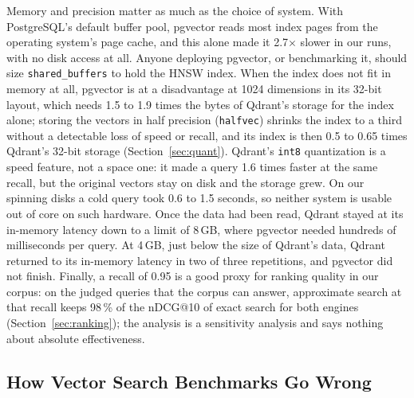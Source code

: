 \documentclass[preprint,12pt]{elsarticle}
\begin{document}
Memory and precision matter as much as the choice of system. With PostgreSQL's
default buffer pool, pgvector reads most index pages from the operating system's page
cache, and this alone made it 2.7$\times$ slower in our runs, with no disk access at all.
Anyone deploying pgvector, or benchmarking it, should size \texttt{shared\_buffers} to
hold the HNSW index. When the index does not fit in memory at all, pgvector is at a
disadvantage at 1024 dimensions in its 32-bit layout, which needs 1.5 to 1.9 times the bytes of Qdrant's storage for the index alone; storing the vectors in half precision
(\texttt{halfvec}) shrinks the index to a third without a detectable loss of speed or recall, and its index is then 0.5 to 0.65 times Qdrant's 32-bit storage
(Section~\ref{sec:quant}). Qdrant's \texttt{int8} quantization is a speed feature, not a space one: it made a query 1.6 times faster at the same recall, but the original vectors stay on disk
and the storage grew. On our spinning disks a cold query took 0.6 to 1.5
seconds, so neither system is usable out of core on such hardware. Once the data had been
read, Qdrant stayed at its in-memory latency down to a limit of 8\,GB, where pgvector needed
hundreds of milliseconds per query. At 4\,GB, just below the size of Qdrant's data, Qdrant
returned to its in-memory latency in two of three repetitions, and pgvector did not finish.
Finally, a recall of 0.95 is a good proxy for ranking quality in our corpus: on the judged queries that the corpus can answer,
approximate search at that recall keeps 98\,\% of the nDCG@10 of exact search for both engines (Section~\ref{sec:ranking}); the analysis is a sensitivity analysis and says nothing about absolute effectiveness.

\subsection{How Vector Search Benchmarks Go Wrong}
\end{document}
